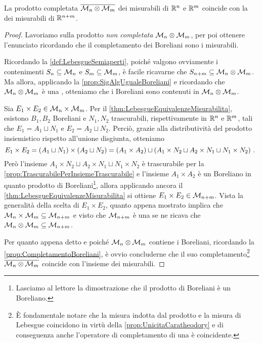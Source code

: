 \begin{proposition}\label{prop:MisuraProdottoEuclidea}
	La \sigalg{} prodotto completata $\overline{\mathcal M_n\otimes\mathcal M_m}$ dei misurabili di $\mathbb R^n$ e $\mathbb R^m$ coincide con la \sigalg{} dei misurabili di $\mathbb R^{n+m}$.
\end{proposition}
\begin{proof}
	Lavoriamo sulla \sigalg{} prodotto \emph{non completata} $\mathcal M_n\otimes\mathcal M_m$, per poi ottenere l'enunciato ricordando che il completamento dei Boreliani sono i misurabili.

	Ricordando la \cref{def:LebesgueSemiaperti}, poiché valgono ovviamente i contenimenti $S_n\subseteq \mathcal M_n$ e $S_m\subseteq \mathcal M_m$, è facile ricavarne che $S_{n+m}\subseteq \mathcal M_n\otimes \mathcal M_m$.
	Ma allora, applicando la \cref{prop:SigAlgUgualeBoreliani} e ricordando che $\mathcal M_n\otimes \mathcal M_m$ è una \sigalg{}, otteniamo che i Boreliani sono contenuti in $\mathcal M_n\otimes\mathcal M_m$.
	
	Sia $E_1\times E_2\in \mathcal M_n\times\mathcal M_m$. Per il \cref{thm:LebesgueEquivalenzeMisurabilita}, esistono $B_1,B_2$ Boreliani e $N_1,N_2$ trascurabili, rispettivamente in $\mathbb R^n$ e $\mathbb R^m$, tali che $E_1=A_1\sqcup N_1$ e $E_2=A_2\sqcup N_2$.
	Perciò, grazie alla distributività del prodotto insiemistico rispetto all'unione disgiunta, otteniamo
	\begin{equation*}
		E_1\times E_2=(A_1\sqcup N_1)\times(A_2\sqcup N_2)=\left(A_1\times A_2\right)\sqcup\left(A_1\times N_2\sqcup A_2\times N_1 \sqcup N_1\times N_2\right) \, \text{. }
	\end{equation*}
	Però l'insieme $A_1\times N_2\sqcup A_2\times N_1 \sqcup N_1\times N_2$ è trascurabile per la \cref{prop:TrascurabilePerInsiemeTrascurabile} e l'insieme $A_1\times A_2$ è un Boreliano in quanto prodotto di Boreliani\footnote{Lasciamo al lettore la dimostrazione che il prodotto di Boreliani è un Boreliano.}, allora applicando ancora il \cref{thm:LebesgueEquivalenzeMisurabilita} si ottiene $E_1\times E_2\in\mathcal M_{n+m}$.
	Vista la generalità della scelta di $E_1\times E_2$, quanto appena mostrato implica che $\mathcal M_n\times\mathcal M_m\subseteq \mathcal M_{n+m}$ e visto che $\mathcal M_{n+m}$ è una \sigalg{} se ne ricava che $\mathcal M_n\otimes\mathcal M_m\subseteq \mathcal M_{n+m}$.
	
	Per quanto appena detto e poiché $\mathcal M_n\otimes\mathcal M_m$ contiene i Boreliani, ricordando la \cref{prop:CompletamentoBoreliani}, è ovvio concluderne che il suo completamento\footnote{È fondamentale notare che la misura indotta dal prodotto e la misura di Lebesgue coincidono in virtù della \cref{prop:UnicitaCaratheodory} e di conseguenza anche l'operatore di completamento di una \sigalg{} è coincidente.} $\overline{\mathcal M_n\otimes\mathcal M_m}$ coincide con l'insieme dei misurabili.
\end{proof}


